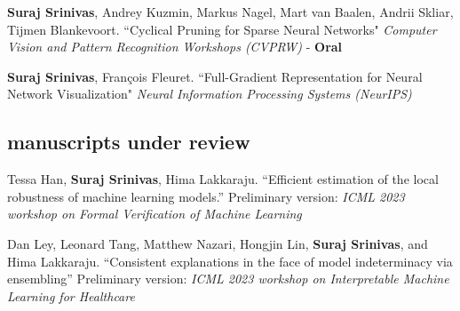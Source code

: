 \documentclass[11pt, a4paper, english]{moderncv}        %
\newcommand{\cvsection}[1]{\vspace{0.3cm}\subsection{\Large{{#1}}}}
\begin{document}
\vspace*{0.25em}
 {\textbf{Suraj Srinivas}, Andrey Kuzmin, Markus Nagel, Mart van Baalen, \newline Andrii Skliar, Tijmen Blankevoort. \newline ``Cyclical Pruning for Sparse Neural Networks" 
\newline \textit{Computer Vision and Pattern Recognition Workshops (CVPRW)} - \textbf{Oral}}

\vspace*{0.25em}

 {\textbf{Suraj Srinivas}, Fran\c{c}ois Fleuret. \newline ``Full-Gradient Representation
for Neural Network Visualization" \newline \textit{Neural Information Processing Systems (NeurIPS)}
}
\vspace*{0.25em}


\vspace*{0.25em}


\vspace*{0.25em}


\cvsection{manuscripts under review}

 {Tessa Han, \textbf{Suraj Srinivas}, Hima Lakkaraju. \newline ``Efficient estimation of the local robustness
of machine learning models.'' 
\newline Preliminary version: \textit{ICML 2023 workshop on Formal Verification of Machine Learning}}

 {Dan Ley, Leonard Tang, Matthew Nazari, Hongjin Lin, \textbf{Suraj Srinivas}, and Hima Lakkaraju. \newline ``Consistent explanations in the face of model indeterminacy via ensembling'' 
\newline Preliminary version: \textit{ICML 2023 workshop on Interpretable Machine Learning for Healthcare}}
\end{document}
